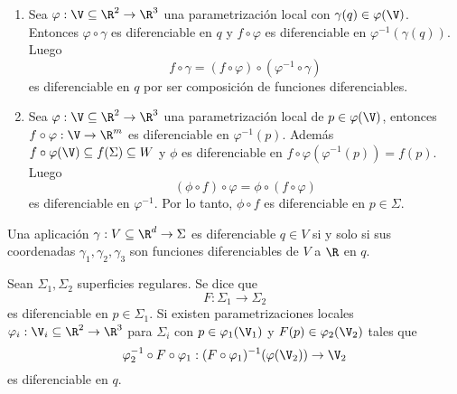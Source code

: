 \documentclass{article}
\begin{document}
\begin{dem}\hspace{1mm}
    \begin{enumerate}
        \item Sea $\varphi:\V\subseteq\R^{2}\to\R^{3}$ una parametrización local con 
        $\gamma(q)\in\varphi(\V)$. Entonces $\varphi\circ\gamma$ es diferenciable en $q$ y 
        $f\circ\varphi$ es diferenciable en $\varphi^{-1}(\gamma(q))$. Luego
        \begin{equation*}
            f\circ\gamma=(f\circ\varphi)\circ(\varphi^{-1}\circ\gamma)
        \end{equation*}
        es diferenciable en $q$ por ser composición de funciones diferenciables.

        \item Sea $\varphi:\V\subseteq\R^{2}\to\R^{3}$ una parametrización local de 
        $p\in\varphi(\V)$, entonces $f\circ\varphi:\V\to\R^{m}$ es diferenciable en 
        $\varphi^{-1}(p)$. Además $f\circ\varphi(\V)\subseteq f(\Sigma)\subseteq W$ y $\phi$ es
        diferenciable en $f\circ\varphi(\varphi^{-1}(p))=f(p)$. Luego
        \begin{equation*}
            (\phi\circ f)\circ\varphi=\phi\circ(f\circ\varphi)
        \end{equation*}
        es diferenciable en $\varphi^{-1}$. Por lo tanto, $\phi\circ f$ es diferenciable en 
        $p\in\Sigma$.
    \end{enumerate}
\end{dem}

\begin{cor}
    Una aplicación $\gamma:V\subseteq\R^{d}\to\Sigma$ es diferenciable $q\in V$ si y solo si
    sus coordenadas $\gamma_{1},\gamma_{2},\gamma_{3}$ son funciones diferenciables de $V$ a $\R$ 
    en $q$.
\end{cor}

\begin{dfn}
    Sean $\Sigma_{1},\Sigma_{2}$ superficies regulares. Se dice que
    \begin{equation*}
        F:\Sigma_{1}\to\Sigma_{2}
    \end{equation*}
    es diferenciable en $p\in\Sigma_{1}$. Si existen parametrizaciones locales 
    $\varphi_{i}:\V_{i}\subseteq\R^{2}\to\R^{3}$ para $\Sigma_{i}$ con $p\in\varphi_{1}(\V_{1})$ y
    $F(p)\in\varphi_{2}(\V_{2})$ tales que
    \begin{equation*}
        \varphi_{2}^{-1}\circ F\circ\varphi_{1}:(F\circ\varphi_{1})^{-1}(\varphi(\V_{2}))\to\V_{2}
    \end{equation*}
    es diferenciable en $q$.
\end{dfn}
\end{document}
